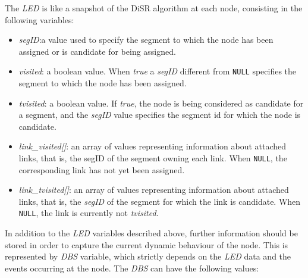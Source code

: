 The \emph{LED} is like a snapshot of the DiSR algorithm at each node,
consisting in the following variables:

\begin{itemize}
\item{\emph{segID}}:a value used to specify the segment to which the
node has been assigned or is candidate for being assigned.
\item{\emph{visited}}: a boolean value. When \emph{true}
a \emph{segID} different from \texttt{NULL} specifies the segment 
to which the node has been assigned. 


\item{\emph{tvisited}}: a boolean value. If \emph{true}, the node is
being considered as candidate for a segment, and the \emph{segID} value
specifies the segment id for which the node is candidate. 
\item{\emph{link\_visited[]}}: an array
of values representing information about attached links, that is, the
segID of the segment owning each link. When \texttt{NULL}, the corresponding link has not yet been
assigned.
\item{\emph{link\_tvisited[]}}: an array of
values representing information about attached links, that is, the \emph{segID} of
the segment for which the link is candidate. When \texttt{NULL}, the link is
currently not \emph{tvisited}.  
\end{itemize}

In addition to the \emph{LED} variables described above, further
information should be stored in order to capture the current dynamic
behaviour of the node. This is represented by \emph{DBS} variable,
which strictly depends on the \emph{LED} data and the events occurring
at the node. The \emph{DBS} can have the following values:

